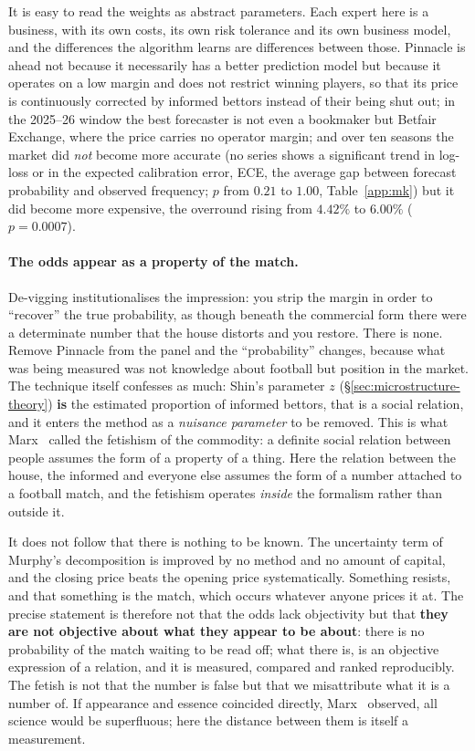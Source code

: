 \documentclass[12pt,a4paper,oneside]{report}
\renewcommand{\_}{\oldunderscore\allowbreak}
\theoremstyle{definition}
\theoremstyle{plain}
\theoremstyle{definition}   %
\begin{document}
It is easy to read the weights as abstract parameters. Each expert here is a business, with its
own costs, its own risk tolerance and its own business model, and the differences the algorithm
learns are differences between those. Pinnacle is ahead not because it necessarily has a better
prediction model but because it operates on a low margin and does not restrict winning players,
so that its price is continuously corrected by informed bettors instead of their being shut out;
in the 2025--26 window the best forecaster is not even a bookmaker but Betfair Exchange, where
the price carries no operator margin; and over ten seasons the market did \emph{not} become more
accurate (no series shows a significant trend in log-loss or in the expected calibration error,
ECE, the average gap between forecast probability and observed frequency; $p$ from $0.21$ to
$1.00$, Table~\ref{app:mk}) but
it did become more expensive, the overround rising from $4.42\%$ to $6.00\%$ ($p=0.0007$).

\paragraph{The odds appear as a property of the match.} De-vigging institutionalises the
impression: you strip the margin in order to ``recover'' the true probability, as though beneath
the commercial form there were a determinate number that the house distorts and you restore.
There is none. Remove Pinnacle from the panel and the ``probability'' changes, because what was
being measured was not knowledge about football but position in the market. The technique itself
confesses as much: Shin's parameter $z$ (\S\ref{sec:microstructure-theory}) \textbf{is} the
estimated proportion of informed bettors, that is a social relation, and it enters the method as
a \emph{nuisance parameter} to be removed. This is what Marx~\cite{marx1867} called the fetishism of the
commodity: a definite social relation between people assumes the form of a property of a thing.
Here the relation between the house, the informed and everyone else assumes the form of a number
attached to a football match, and the fetishism operates \emph{inside} the formalism rather than
outside it.

It does not follow that there is nothing to be known. The uncertainty term of Murphy's
decomposition is improved by no method and no amount of capital, and the closing price beats the
opening price systematically. Something resists, and that something is the match, which occurs
whatever anyone prices it at. The precise statement is therefore not that the odds lack
objectivity but that \textbf{they are not objective about what they appear to be about}: there is
no probability of the match waiting to be read off; what there is, is an objective expression
of a relation, and it is measured, compared and ranked reproducibly. The fetish is not that the number
is false but that we misattribute what it is a number of. If appearance and essence coincided
directly, Marx~\cite{marx1894} observed, all science would be superfluous; here the distance between them is
itself a measurement.
\end{document}
